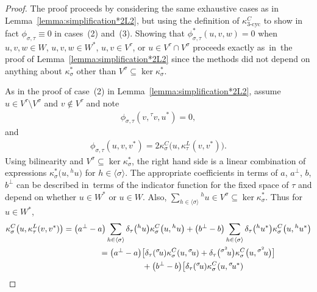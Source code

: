\documentclass[10pt,a4paper]{amsart}
\numberwithin{equation}{section}
\newcommand{\actby}[1]{{}^{#1}}
\newcommand{\actbylessspace}[1]{{}^{#1}\!}
\DeclareMathOperator{\tri}{3-cyc}
\begin{document}
\begin{proof}
The proof proceeds by considering the same exhaustive cases as in Lemma~\ref{lemma:simplification*2L2},
but using the definition of $\kappa^C_{\tri}$ to show in fact $\phi_{\sigma,\tau}\equiv 0$ in cases~(2) and~(3).
Showing that $\phi^{*}_{\sigma,\tau}(u,v,w)=0$ when
$u,v,w \in W$, $u,v,w \in W^*$, $u,v\in V^{\tau}$, or $u \in V^{\tau}\cap V^{\sigma}$
proceeds exactly as~in~the proof of Lemma~\ref{lemma:simplification*2L2}
since the methods did not depend on anything about $\kappa^*_\sigma$ other than
$V^{\sigma} \subseteq \ker \kappa^*_{\sigma}$.

As in the proof of case~(2) in Lemma~\ref{lemma:simplification*2L2}, assume
$u \in V^{\tau} \setminus V^{\sigma}$ and $v \notin V^\tau$ and note
	\begin{gather*}
	\phi_{\sigma,\tau}(v,\actbylessspace{\tau}v,u^*)=0,
	\end{gather*}
and
	\begin{gather*}
	\phi_{\sigma,\tau}(u,v,v^*)=2\kappa^C_{\sigma}\big(u,\kappa^L_{\tau}(v,v^*)\big).
	\end{gather*}
Using bilinearity and $V^{\sigma} \subseteq \ker \kappa^*_{\sigma}$, the right hand
side is a linear combination of expressions $\kappa^*_{\sigma}\big(u,\actby{h}u\big)$ for
$h \in \langle \sigma \rangle$. The appropriate coefficients in terms of $a$, $a^\perp$, $b$, $b^\perp$
can be described in~terms of the indicator function for the fixed space of $\tau$
and depend on whether $u \in W^*$ or $u \in W$.
Also, $\sum_{h \in \langle \sigma \rangle} \actby{h}u \in V^{\sigma} \subseteq \ker \kappa^*_{\sigma}$.
Thus for $u \in W^*$,
\begin{gather*}
\kappa^C_{\sigma}\big(u,\kappa^L_{\tau}(v,v^*)\big)
=\big(a^\perp-a\big)\sum\limits_{h \in \langle \sigma \rangle}
\delta_{\tau}\big(\actby{h}u\big)\kappa^C_{\sigma}\big(u,\actby{h}u\big)
+\big(b^\perp-b\big)\sum\limits_{h \in \langle \sigma \rangle}
\delta_{\tau}\big(\actby{h}u^*\big)\kappa^C_{\sigma}\big(u,\actby{h}u^*\big)
\\ \hphantom{\kappa^C_{\sigma}\big(u,\kappa^L_{\tau}(v,v^*)\big)}
=\big(a^\perp-a\big)\big[\delta_{\tau}(\actbylessspace{\sigma}u)\kappa^C_{\sigma}(u,\actbylessspace{\sigma}u)
+\delta_{\tau}\big(\actbylessspace{\sigma^2}u\big)\kappa^C_{\sigma}\big(u,\actbylessspace{\sigma^2}u\big)\big]
\\ \hphantom{\kappa^C_{\sigma}\big(u,\kappa^L_{\tau}(v,v^*)\big)=}
\phantom{,}+\big(b^\perp-b\big)\big[\delta_{\tau}(\actbylessspace{\sigma}u)\kappa^C_{\sigma}(u,\actbylessspace{\sigma}u^*)

\end{gather*}
\end{proof}
\end{document}
